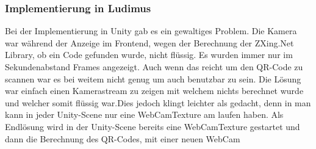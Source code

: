 \subsubsection{Implementierung in Ludimus}
Bei der Implementierung in Unity gab es ein gewaltiges Problem. Die Kamera war während der Anzeige im Frontend, wegen der Berechnung der ZXing.Net Library, ob ein Code gefunden wurde, nicht flüssig. Es wurden immer nur im Sekundenabstand Frames angezeigt. Auch wenn das reicht um den QR-Code zu scannen war es bei weitem nicht genug um auch benutzbar zu sein. Die Lösung war einfach einen Kamerastream zu zeigen mit welchem nichts berechnet wurde und welcher somit flüssig war.Dies jedoch klingt leichter als gedacht, denn in man kann in jeder Unity-Scene nur eine WebCamTexture am laufen haben. Als Endlösung wird in der Unity-Scene bereits eine WebCamTexture gestartet und dann die Berechnung des QR-Codes, mit einer neuen WebCam

